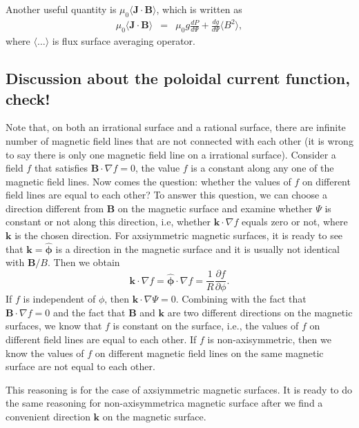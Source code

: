 \documentclass{llncs}
\newcommand{\tmmathbf}[1]{\ensuremath{\boldsymbol{#1}}}
\begin{document}
Another useful quantity is $\mu_0 \langle \mathbf{J} \cdot \mathbf{B}
\rangle$, which is written as
\begin{eqnarray}
  \mu_0 \langle \mathbf{J} \cdot \mathbf{B} \rangle & = & \mu_0 g \frac{d P}{d
  \Psi} + \frac{d g}{d \Psi} \langle B^2 \rangle, 
\end{eqnarray}
where $\langle \ldots \rangle$ is flux surface averaging operator.

\subsection{Discussion about the poloidal current function,
check!}\label{11-2-p4}

Note that, on both an irrational surface and a rational surface, there are
infinite number of magnetic field lines that are not connected with each other
(it is wrong to say there is only one magnetic field line on a irrational
surface). Consider a field $f$ that satisfies $\mathbf{B} \cdot \nabla f = 0$,
the value $f$ is a constant along any one of the magnetic field lines. Now
comes the question: whether the values of $f$ on different field lines are
equal to each other? To answer this question, we can choose a direction
different from $\mathbf{B}$ on the magnetic surface and examine whether $\Psi$
is constant or not along this direction, i.e, whether $\mathbf{k} \cdot \nabla
f$ equals zero or not, where $\mathbf{k}$ is the chosen direction. For
axsiymmetric magnetic surfaces, it is ready to see that $\mathbf{k}=
\hat{\tmmathbf{\phi}}$ is a direction in the magnetic surface and it is
usually not identical with $\mathbf{B}/ B$. Then we obtain
\begin{equation}
  \mathbf{k} \cdot \nabla f = \hat{\tmmathbf{\phi}} \cdot \nabla f =
  \frac{1}{R}  \frac{\partial f}{\partial \phi} .
\end{equation}
If $f$ is independent of $\phi$, then $\mathbf{k} \cdot \nabla \Psi = 0$.
Combining with the fact that $\mathbf{B} \cdot \nabla f = 0$ and the fact that
$\mathbf{B}$ and $\mathbf{k}$ are two different directions on the magnetic
surfaces, we know that $f$ is constant on the surface, i.e., the values of $f$
on different field lines are equal to each other. If $f$ is non-axisymmetric,
then we know the values of $f$ on different magnetic field lines on the same
magnetic surface are not equal to each other.

This reasoning is for the case of axsiymmetric magnetic surfaces. It is ready
to do the same reasoning for non-axisymmetrica magnetic surface after we find
a convenient direction $\mathbf{k}$ on the magnetic surface.
\end{document}
